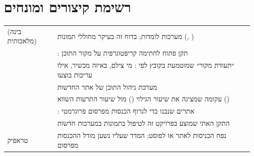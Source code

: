 \section*{רשימת קיצורים ומונחים}
\begin{table}[!htb]\centering
\begin{tabularx}{\linewidth}{@{}l Y@{}}
\toprule
{} &  \\
\midrule
{} (בינה מלאכותית) & מערכות לומדות; בדוח זה בעיקר מחוללי תמונות (, ) \\
 & : תקן פתוח לחתימה קריפטוגרפית על מקור התוכן \\
 & ״תעודת מקור״ שמוטמעת בקובץ לפי : מי צילם, באיזה מכשיר, אילו עריכות בוצעו \\
 & מערכת ניהול התוכן של אתר החדשות \\
 & עקומה שמציגה את שיעור הגילוי () מול שיעור התרעות השווא () \\
 & : אתרים שנבנו כדי לגרוף הכנסות מפרסום פרוגרמטי \\
 & התקן האתי שמוצע בפרויקט זה לטיפול בתמונות במערכות חדשות \\
טראפיק & נפח הכניסות לאתר או לפוסט; המדד שעליו נשען מודל ההכנסות מפרסום \\
\bottomrule
\end{tabularx}
\end{table}

\clearpage
{\small\setlength{\parskip}{0pt}\tableofcontents}

\clearpage
{\small\setlength{\parskip}{0pt}\listoffigures\listoftables}

